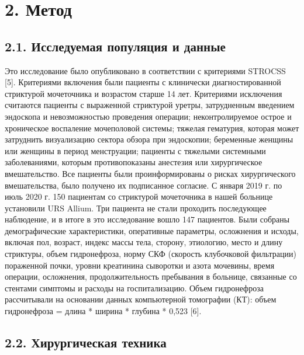 \chapter{2. Метод}
\section{2.1. Исследуемая популяция и данные}

Это исследование было опубликовано в соответствии с критериями STROCSS [5]. Критериями включения были пациенты с клинически диагностированной стриктурой мочеточника и возрастом старше 14 лет. Критериями исключения считаются пациенты с выраженной стриктурой уретры, затрудненным введением эндоскопа и невозможностью проведения операции; неконтролируемое острое и хроническое воспаление мочеполовой системы; тяжелая гематурия, которая может затруднить визуализацию сектора обзора при эндоскопии; беременные женщины или женщины в период менструации; пациенты с тяжелыми системными заболеваниями, которым противопоказаны анестезия или хирургическое вмешательство.
Все пациенты были проинформированы о рисках хирургического вмешательства, было получено их подписанное согласие. С января 2019 г. по июль 2020 г. 150 пациентам со стриктурой мочеточника в нашей больнице установили URS Allium.
Три пациента не стали проходить последующее наблюдение, и в итоге в это исследование вошло 147 пациентов. Были собраны демографические характеристики, оперативные параметры, осложнения и исходы, включая пол, возраст, индекс массы тела, сторону, этиологию, место и длину стриктуры, объем гидронефроза, норму СКФ (скорость клубочковой фильтрации) пораженной почки, уровни креатинина сыворотки и азота мочевины, время операции, осложнения, продолжительность пребывания в больнице, связанные со стентами симптомы и расходы на госпитализацию. Объем гидронефроза рассчитывали на основании данных компьютерной томографии (КТ): объем гидронефроза = длина * ширина * глубина * 0,523 [6].

\section{2.2. Хирургическая техника}

